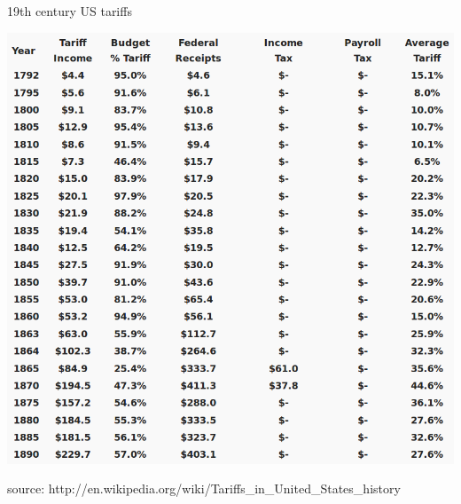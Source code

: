 \documentclass{beamer}
\begin{document}
\begin{frame}{19th century US tariffs}

    \includegraphics[scale=0.25]{US_tariffs_19th.png}

    {\tiny source: http://en.wikipedia.org/wiki/Tariffs\_in\_United\_States\_history}

\end{frame}
\end{document}
